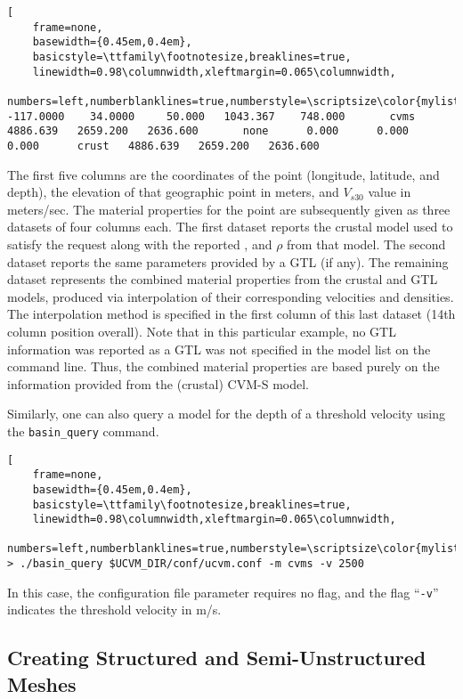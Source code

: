\begin{lstlisting}[
	frame=none,
	basewidth={0.45em,0.4em},
	basicstyle=\ttfamily\footnotesize,breaklines=true,
	linewidth=0.98\columnwidth,xleftmargin=0.065\columnwidth,
	numbers=left,numberblanklines=true,numberstyle=\scriptsize\color{mylistingnclr}]
-117.0000    34.0000     50.000   1043.367    748.000       cvms   4886.639   2659.200   2636.600       none      0.000      0.000      0.000      crust   4886.639   2659.200   2636.600
\end{lstlisting}

The first five columns are the coordinates of the point (longitude, latitude, and depth), the elevation of that geographic point in meters, and $V_{s30}$ value in meters/sec. The material properties for the point are subsequently given as three datasets of four columns each. The first dataset reports the crustal model used to satisfy the request along with the reported \vp{}, \vs{} and $\rho$ from that model. The second dataset reports the same parameters provided by a GTL (if any). The remaining dataset represents the combined material properties from the crustal and GTL models, produced via interpolation of their corresponding velocities and densities. The interpolation method is specified in the first column of this last dataset (14th column position overall). Note that in this particular example, no GTL information was reported as a GTL was not specified in the model list on the command line. Thus, the combined material properties are based purely on the information provided from the (crustal) CVM-S model.

Similarly, one can also query a model for the depth of a threshold velocity using the \texttt{basin\_query} command.

\begin{lstlisting}[
	frame=none,
	basewidth={0.45em,0.4em},
	basicstyle=\ttfamily\footnotesize,breaklines=true,
	linewidth=0.98\columnwidth,xleftmargin=0.065\columnwidth,
	numbers=left,numberblanklines=true,numberstyle=\scriptsize\color{mylistingnclr}]
> ./basin_query $UCVM_DIR/conf/ucvm.conf -m cvms -v 2500
\end{lstlisting}

\noindent
In this case, the configuration file parameter requires no flag, and the flag ``\texttt{-v}'' indicates the threshold \vs{} velocity in m/s.

\subsection{Creating Structured and Semi-Unstructured Meshes}

